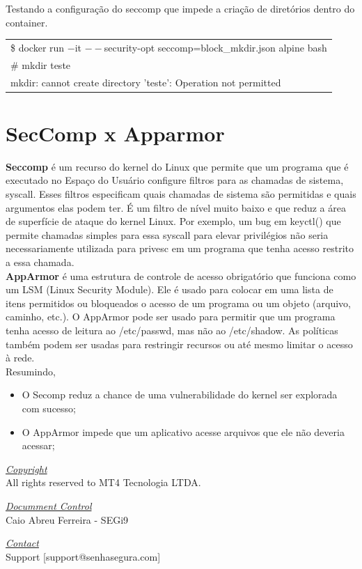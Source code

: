 \documentclass[12pt]{article}
\begin{document}
Testando a configuração do seccomp que impede a criação de diretórios dentro do container.\\

\begin{table}[H]
	\begin{tabular}{|l|}
	\hline
	\$ docker run $-$it $--$security-opt seccomp=block\_mkdir.json alpine bash\\
	\# mkdir teste\\
	mkdir: cannot create directory 'teste': Operation not permitted\\
	\hline
	\end{tabular}
\end{table}

\section{SecComp x Apparmor}

\textbf{Seccomp} é um recurso do kernel do Linux que permite que um programa que é executado no Espaço do Usuário configure filtros para as chamadas de sistema, syscall. Esses filtros especificam quais chamadas de sistema são permitidas e quais argumentos elas podem ter. É um filtro de nível muito baixo e que reduz a área de superfície de ataque do kernel Linux. Por exemplo, um bug em keyctl() que permite chamadas simples para essa syscall para elevar privilégios não seria necessariamente utilizada para privesc em um programa que tenha acesso restrito a essa chamada.\\

\textbf{AppArmor} é uma estrutura de controle de acesso obrigatório que funciona como um LSM (Linux Security Module). Ele é usado para colocar em uma lista de itens permitidos ou bloqueados o acesso de um programa ou um objeto (arquivo, caminho, etc.). O AppArmor pode ser usado para permitir que um programa tenha acesso de leitura ao /etc/passwd, mas não ao /etc/shadow. As políticas também podem ser usadas para restringir recursos ou até mesmo limitar o acesso à rede.\\

Resumindo,
\begin{itemize}
	\item O Secomp reduz a chance de uma vulnerabilidade do kernel ser explorada com sucesso;
	\item O AppArmor impede que um aplicativo acesse arquivos que ele não deveria acessar;
\end{itemize}

\pagebreak
\vspace*{\fill}
\begin{flushright}
	\underline{\textit{Copyright}}\\
	All rights reserved to MT4 Tecnologia LTDA.\bigskip

	\underline{\textit{Documment Control}}\\
	Caio Abreu Ferreira - SEGi9\bigskip

	\underline{\textit{Contact}}\\
	Support [support@senhasegura.com]\bigskip
\end{flushright}

\pagebreak
\end{document}
